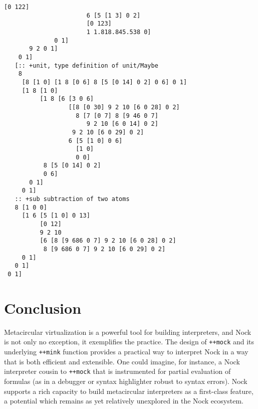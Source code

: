 \documentclass[twoside]{article}
\begin{document}
\begin{lstlisting}[style=listingcode]
                       [0 122]
                       6 [5 [1 3] 0 2]
                       [0 123]
                       1 1.818.845.538 0]
              0 1]
       9 2 0 1]
    0 1]
   [:: +unit, type definition of unit/Maybe
    8
     [8 [1 0] [1 8 [0 6] 8 [5 [0 14] 0 2] 0 6] 0 1]
     [1 8 [1 0]
          [1 8 [6 [3 0 6]
                  [[8 [0 30] 9 2 10 [6 0 28] 0 2]
                    8 [7 [0 7] 8 [9 46 0 7]
                       9 2 10 [6 0 14] 0 2]
                   9 2 10 [6 0 29] 0 2]
                  6 [5 [1 0] 0 6]
                    [1 0]
                    0 0]
           8 [5 [0 14] 0 2]
           0 6]
       0 1]
     0 1]
   :: +sub subtraction of two atoms
   8 [1 0 0]
     [1 6 [5 [1 0] 0 13]
          [0 12]
          9 2 10
          [6 [8 [9 686 0 7] 9 2 10 [6 0 28] 0 2]
           8 [9 686 0 7] 9 2 10 [6 0 29] 0 2]
     0 1]
   0 1]
 0 1]
\end{lstlisting}

\section{Conclusion}

Metacircular virtualization is a powerful tool for building interpreters, and Nock is not only no exception, it exemplifies the practice.  The design of \lstinline[style=inlinecode]{++mock} and its underlying \lstinline[style=inlinecode]{++mink} function provides a practical way to interpret Nock in a way that is both efficient and extensible.  One could imagine, for instance, a Nock interpreter cousin to \lstinline[style=inlinecode]{++mock} that is instrumented for partial evaluation of formulas (as in a debugger or syntax highlighter robust to syntax errors).  Nock supports a rich capacity to build metacircular interpreters as a first-class feature, a potential which remains as yet relatively unexplored in the Nock ecosystem.

\printbibliography
\end{document}
